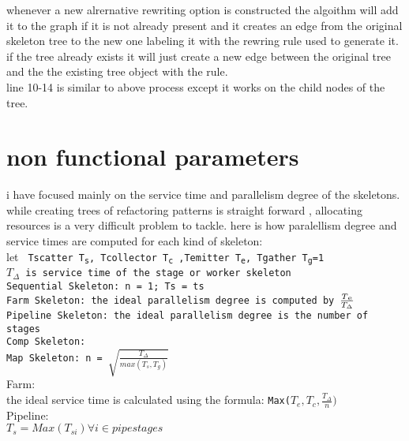\documentclass[12pt]{report}
\begin{document}
whenever a new alrernative rewriting option is constructed the algoithm will add it to the graph if it is not already present and it creates an edge from the original skeleton tree to the new one labeling it with the rewring rule used to generate it. if the tree already exists it will just create a new edge between the original tree and the the existing tree object with the rule. \\
line 10-14 is similar to above process except it works on the child nodes of the tree.

\section{non functional parameters}
i have focused mainly on the service time and parallelism degree of the skeletons. 
while creating trees of refactoring patterns is straight forward , allocating resources is a very difficult problem to tackle. here is how  paralellism degree and service times are computed for each kind of skeleton:\\
	let \texttt{ Tscatter 	T\textsubscript{s}, 					Tcollector T\textsubscript{c} ,Temitter T\textsubscript{e}, Tgather T\textsubscript{g}=1\\
	$T_{\Delta}$ is service time of the stage or worker skeleton\\
	Sequential Skeleton:	n = 1; Ts = ts\\
	Farm Skeleton:	the ideal parallelism degree is computed by $\frac{T\textsubscript{e}}{T_{\Delta}}$\\
	Pipeline Skeleton: the ideal parallelism degree is the number of stages\\
	Comp Skeleton:\\
     Map Skeleton:  n = $\sqrt{\frac{T_{\Delta}}{max(T_s, T_g)}}$}\\
Farm:\\
	the ideal service time is calculated using the formula: \texttt {Max($T_e,T_c,\frac{T_\Delta}{n})$}\\
Pipeline:\\
	\texttt{$T_s = Max(T_{si}) \forall i \in pipe stages$}
\end{document}
